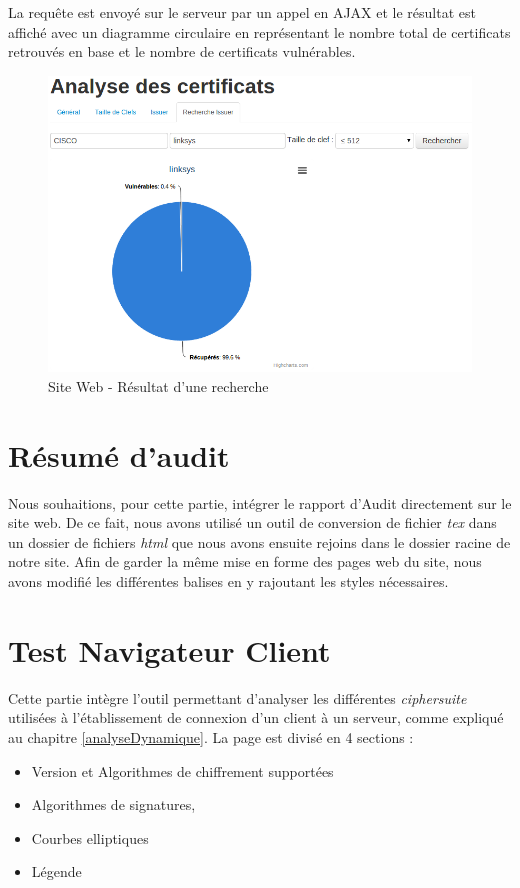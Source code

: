 La requête est envoyé sur le serveur par un appel en AJAX et le résultat est affiché avec un diagramme circulaire en représentant le nombre total de certificats retrouvés en base et le nombre de certificats vulnérables.

\begin{figure}[H]
\begin{center}
\includegraphics[scale=0.5]{images/site_web_search_result.png}
\end{center}
\caption{Site Web - Résultat d'une recherche}
\label{search_result}
\end{figure}

 
\section{Résumé d'audit}

Nous souhaitions, pour cette partie, intégrer le rapport d'Audit directement sur le site web. De ce fait, nous avons utilisé un outil de conversion de fichier \textit{tex} dans un dossier de fichiers \textit{html} que nous avons ensuite rejoins dans le dossier racine de notre site. Afin de garder la même mise en forme des pages web du site, nous avons modifié les différentes balises en y rajoutant les styles nécessaires.


\section{Test Navigateur Client}

Cette partie intègre l'outil permettant d'analyser les différentes \textit{ciphersuite} utilisées à l'établissement de connexion d'un client à un serveur, comme expliqué au chapitre \ref{analyseDynamique}. La page est divisé en 4 sections :
\begin{itemize}
\item Version et Algorithmes de chiffrement supportées
\item Algorithmes de signatures,
\item Courbes elliptiques
\item Légende\\
\end{itemize}

